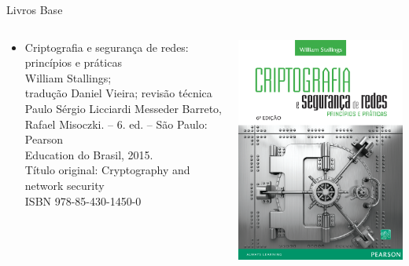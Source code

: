 \begin{frame}{Livros Base}
\centering
\begin{columns}
    \begin{column}{0.5\linewidth}
      \begin{itemize}
          \item Criptografia e segurança de redes: princípios e práticas \\ William
Stallings;\\ tradução Daniel Vieira; revisão técnica Paulo Sérgio Licciardi
Messeder Barreto, Rafael Misoczki. – 6. ed. – São Paulo: Pearson
\\Education do Brasil, 2015.
\\Título original: Cryptography and network security
\\ISBN 978-85-430-1450-0
      \end{itemize}
    \end{column}
    \begin{column}{0.5\linewidth}
        \includegraphics[width=0.8\linewidth]{Figuras/livro-stallings-cripto.png}
    \end{column}
\end{columns}

\end{frame}

